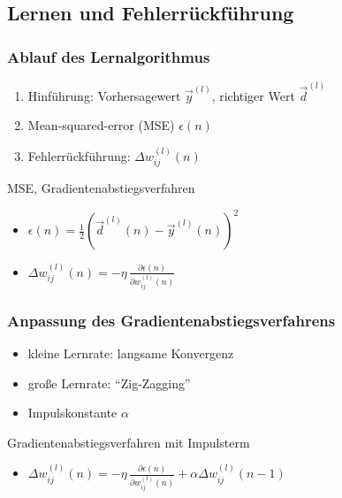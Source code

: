 \subsection{Lernen und Fehlerrückführung}
\begin{frame}
  \frametitle{Ablauf des Lernalgorithmus}
  \begin{enumerate}
    \item Hinführung: Vorhersagewert $\vec{y}^{(l)}$, richtiger Wert $\vec{d}^{(l)}$
    \item Mean-squared-error (MSE) $\epsilon(n)$
    \item Fehlerrückführung: $\Delta w_{ij}^{\left( l \right)}\left(n\right)$
  \end{enumerate}
   \begin{block}{MSE, Gradientenabstiegsverfahren}
      \begin{itemize}
        \item $\epsilon \left ( n \right) = \frac{1}{2} \left( \vec{d}^{\left( l \right)}\left( n \right) -  \vec{y}^{\left( l \right)}\left( n \right)\right)^2$
        \item $\Delta w_{ij}^{\left( l \right)}\left(n\right) = - \eta \, \frac{\partial \epsilon\left(n\right)}{\partial w_{ij}^{\left( l \right)}\left(n\right) }$
      \end{itemize}
   \end{block}
\end{frame}

\begin{frame}
   \frametitle{Anpassung des Gradientenabstiegsverfahrens}
   \begin{itemize}
     \item kleine Lernrate: langsame Konvergenz
     \item große Lernrate: \enquote{Zig-Zagging}
     \item Impulskonstante $\alpha$
   \end{itemize}
   \begin{block}{Gradientenabstiegsverfahren mit Impulsterm}
      \begin{itemize}
        \item $\Delta w_{ij}^{\left( l \right)}\left(n\right) = - \eta \, \frac{\partial \epsilon\left(n\right)}{\partial w_{ij}^{\left( l \right)}\left(n\right) } + \alpha \Delta w_{ij}^{\left( l \right)}\left(n-1\right) $
      \end{itemize}
   \end{block}
\end{frame}

